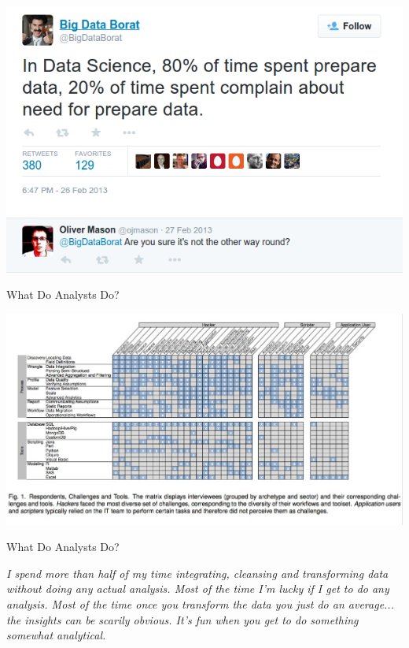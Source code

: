 \documentclass{beamer}
\begin{document}
\begin{frame}{}
    \begin{center}
        \includegraphics[scale=0.4]{bigDataWork.png}
    \end{center}
\end{frame}
\begin{frame}{What Do Analysts Do?}
    \begin{center}
        \includegraphics[scale=0.3]{whatDoAnalystsDo.png}
    \end{center}
\end{frame}
\begin{frame}{What Do Analysts Do?}
    \begin{center}
        {\em I spend more than half of my time integrating,
        cleansing and transforming data without doing any
        actual analysis. Most of the time I'm lucky if I get to
        do any analysis. Most of the time once you transform
        the data you just do an average... the insights can be
        scarily obvious. It's fun when you get to do something
        somewhat analytical.}
    \end{center}
\end{frame}
\end{document}
